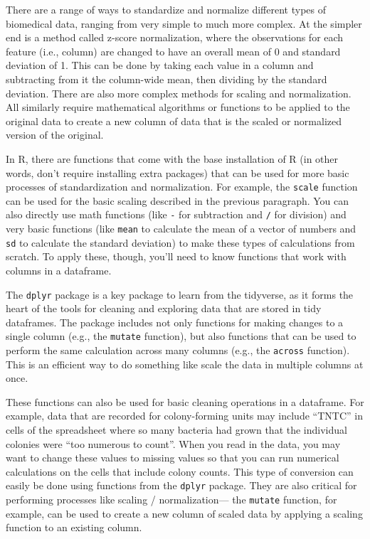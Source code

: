 \documentclass[]{tufte-book}
\begin{document}
There are a range of ways to standardize and normalize different types of
biomedical data, ranging from very simple to much more complex. At the simpler
end is a method called z-score normalization, where the observations for each
feature (i.e., column) are changed to have an overall mean of 0 and standard
deviation of 1. This can be done by taking each value in a column and
subtracting from it the column-wide mean, then dividing by the standard
deviation. There are also more complex methods for scaling and normalization.
All similarly require mathematical algorithms or functions to be applied to the
original data to create a new column of data that is the scaled or normalized
version of the original.

In R, there are functions that come with the base installation of R (in other
words, don't require installing extra packages) that can be used for more basic
processes of standardization and normalization. For example, the \texttt{scale}
function can be used for the basic scaling described in the previous paragraph.
You can also directly use math functions (like \texttt{-} for subtraction and \texttt{/} for
division) and very basic functions (like \texttt{mean} to calculate the mean of a
vector of numbers and \texttt{sd} to calculate the standard deviation) to make these
types of calculations from scratch. To apply these, though, you'll need to know
functions that work with columns in a dataframe.

The \texttt{dplyr} package is a key package to learn from the tidyverse, as it forms
the heart of the tools for cleaning and exploring data that are stored in tidy
dataframes. The package includes not only functions for making changes to a
single column (e.g., the \texttt{mutate} function), but also functions that can be used
to perform the same calculation across many columns (e.g., the \texttt{across}
function). This is an efficient way to do something like scale the data in
multiple columns at once.

These functions can also be used for basic cleaning operations in a dataframe.
For example, data that are recorded for colony-forming units may include ``TNTC''
in cells of the spreadsheet where so many bacteria had grown that the individual
colonies were ``too numerous to count''. When you read in the data, you may want
to change these values to missing values so that you can run numerical
calculations on the cells that include colony counts. This type of conversion
can easily be done using functions from the \texttt{dplyr} package. They are also
critical for performing processes like scaling / normalization--- the \texttt{mutate}
function, for example, can be used to create a new column of scaled data by
applying a scaling function to an existing column.
\end{document}
